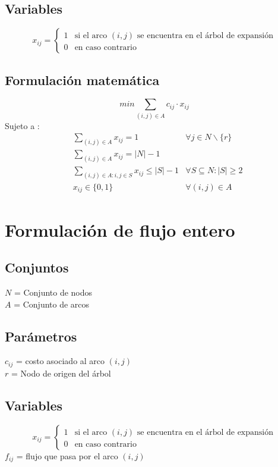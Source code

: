 \documentclass{article}
\numberwithin{equation}{section}
\begin{document}
\subsection{Variables}
\begin{flushleft}
\[x_{ij}={\begin{cases}1&{\mbox{si el arco $(i,j)$ se encuentra en el árbol de expansión}}\\0&{\mbox{en caso contrario}}\end{cases}}
\]
\end{flushleft}
\subsection{Formulación matemática}
\begin{equation}
min \sum_{(i,j) \in A} c_{ij} \cdot x_{ij}
\end{equation}
Sujeto a : \begin{align}
& \sum_{(i,j) \in A} x_{ij} = 1 &\forall j \in N \backslash \{r\}\\
& \sum_{(i,j) \in A} x_{ij} = |N| - 1\\
& \sum_{(i,j) \in A: i,j \in S} x_{ij} \leq |S| - 1 &\forall S \subseteq N : |S| \geq 2 \\
& x_{ij} \in \{0,1\} &\forall (i,j) \in A
\end{align}

\newpage
\section{Formulación de flujo entero}
\subsection{Conjuntos}
$N$ = Conjunto de nodos\\
$A$ = Conjunto de arcos
\subsection{Parámetros}
$c_{ij}$ = costo asociado al arco $(i,j)$\\
$r$ = Nodo de origen del árbol
\subsection{Variables}
\begin{center}
\[x_{ij}={\begin{cases}1&{\mbox{si el arco $(i,j)$ se encuentra en el árbol de expansión}}\\0&{\mbox{en caso contrario}}\end{cases}}
\]
$f_{ij}$ = flujo que pasa por el arco $(i,j)$
\end{center}
\end{document}
